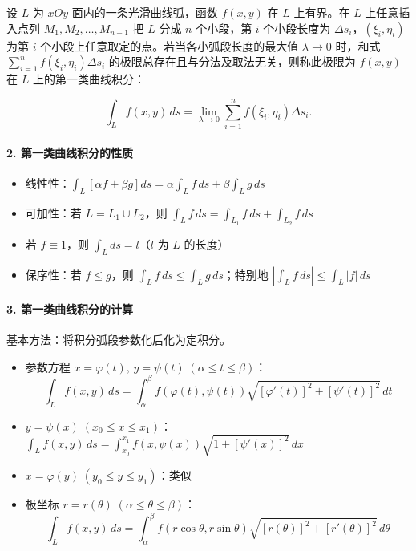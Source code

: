 \documentclass[12pt]{ctexart}
\begin{document}
设 $L$ 为 $xOy$ 面内的一条光滑曲线弧，函数 $f(x,y)$ 在 $L$ 上有界。在 $L$ 上任意插入点列 $M_1,M_2,\dots,M_{n-1}$ 把 $L$ 分成 $n$ 个小段，第 $i$ 个小段长度为 $\Delta s_i$，$(\xi_i,\eta_i)$ 为第 $i$ 个小段上任意取定的点。若当各小弧段长度的最大值 $\lambda\to0$ 时，和式 $\sum_{i=1}^n f(\xi_i,\eta_i)\Delta s_i$ 的极限总存在且与分法及取法无关，则称此极限为 $f(x,y)$ 在 $L$ 上的第一类曲线积分：

\[
\int_L f(x,y)\,ds = \lim_{\lambda\to0}\sum_{i=1}^n f(\xi_i,\eta_i)\Delta s_i.
\]

\paragraph{2. 第一类曲线积分的性质}

\begin{itemize}[itemsep=2pt]
\item 线性性：$\int_L[\alpha f+\beta g]ds = \alpha\int_L f\,ds + \beta\int_L g\,ds$
\item 可加性：若 $L=L_1\cup L_2$，则 $\int_L f\,ds = \int_{L_1}f\,ds + \int_{L_2}f\,ds$
\item 若 $f\equiv1$，则 $\int_L ds = l$（$l$ 为 $L$ 的长度）
\item 保序性：若 $f\le g$，则 $\int_L f\,ds \le \int_L g\,ds$；特别地 $|\int_L f\,ds| \le \int_L |f|\,ds$
\end{itemize}

\paragraph{3. 第一类曲线积分的计算}

基本方法：将积分弧段参数化后化为定积分。

\begin{itemize}[itemsep=4pt]
\item 参数方程 $x=\varphi(t),\,y=\psi(t)\;(\alpha\le t\le\beta)$：
\[
\int_L f(x,y)\,ds = \int_\alpha^\beta f(\varphi(t),\psi(t))\sqrt{[\varphi'(t)]^2+[\psi'(t)]^2}\,dt
\]
\item $y=\psi(x)\;(x_0\le x\le x_1)$：$\displaystyle\int_L f(x,y)\,ds = \int_{x_0}^{x_1} f(x,\psi(x))\sqrt{1+[\psi'(x)]^2}\,dx$
\item $x=\varphi(y)\;(y_0\le y\le y_1)$：类似
\item 极坐标 $r=r(\theta)\;(\alpha\le\theta\le\beta)$：
\[
\int_L f(x,y)\,ds = \int_\alpha^\beta f(r\cos\theta,r\sin\theta)\sqrt{[r(\theta)]^2+[r'(\theta)]^2}\,d\theta
\]
\end{itemize}
\end{document}
